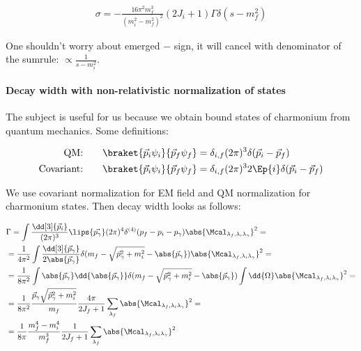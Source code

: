 \begin{align} \label{eq:app:crsc-dw-subthr}
    \sigma = -\frac{16 \pi^2 m_f^3}{(m_i^2 - m_f^2)^2} (2J_i + 1) \Gamma \delta(s - m_f^2)
\end{align}

One shouldn't worry about emerged $-$ sign, it will cancel with denominator of the sumrule: $\propto \frac{1}{s - m_i^2}$.

\paragraph{Decay width with non-relativistic normalization of states} \label{par:app:dw-nr}
The subject is useful for us because we obtain bound states of charmonium from quantum mechanics. Some definitions:

\begin{align}
    \text{QM:}\qquad &\braket{\vec{p}_i \psi_i}{\vec{p}_f \psi_f} = \delta_{i, f} (2\pi)^3 \delta(\vec{p}_i - \vec{p}_f) \\
    \text{Covariant:}\qquad &\braket{\vec{p}_i \psi_i}{\vec{p}_f \psi_f} = \delta_{i, f} (2\pi)^3 2 \Ep{i} \delta(\vec{p}_i - \vec{p}_f)
\end{align}

We use covariant normalization for EM field and QM normalization for charmonium states. Then decay width looks as follows:

\begin{align}
    &\Gamma = \int \frac{\dd[3]{\vec{p}_i}}{(2\pi)^3} \lips{\vec{p_\gamma}}  (2\pi)^4 \delta^{(4)}(p_f - p_i - p_\gamma) \abs{\Mcal_{\lambda_f, \lambda_i \lambda_\gamma}}^2 = \\
    &= \frac{1}{4 \pi^2} \int \frac{\dd[3]{\vec{p}_\gamma}}{2 \abs{\vec{p}_\gamma}} \delta(m_f - \sqrt{\vec{p}_\gamma^2 + m_i^2} - \abs{\vec{p}_\gamma}) \abs{\Mcal_{\lambda_f, \lambda_i \lambda_\gamma}}^2 = \\
    &= \frac{1}{8\pi^2} \int \abs{\vec{p}_\gamma} \dd{\abs{\vec{p}_\gamma}} \delta(m_f - \sqrt{\vec{p}_\gamma^2 + m_i^2} - \abs{\vec{p}_\gamma}) \int \dd{\Omega}\abs{\Mcal_{\lambda_f, \lambda_i \lambda_\gamma}}^2 = \\
    &= \frac{1}{8 \pi^2} \frac{\vec{p}_\gamma \sqrt{\vec{p}_\gamma^2 + m_i^2}}{m_f} \frac{4 \pi}{2J_f + 1} \sum_{\lambda_f} \abs{\Mcal_{\lambda_f, \lambda_i \lambda_\gamma}}^2 = \\
    &= \frac{1}{8 \pi} \frac{m_f^4 - m_i^4}{m_f^3} \frac{1}{2J_f + 1} \sum_{\lambda_f} \abs{\Mcal_{\lambda_f, \lambda_i \lambda_\gamma}}^2
\end{align}
